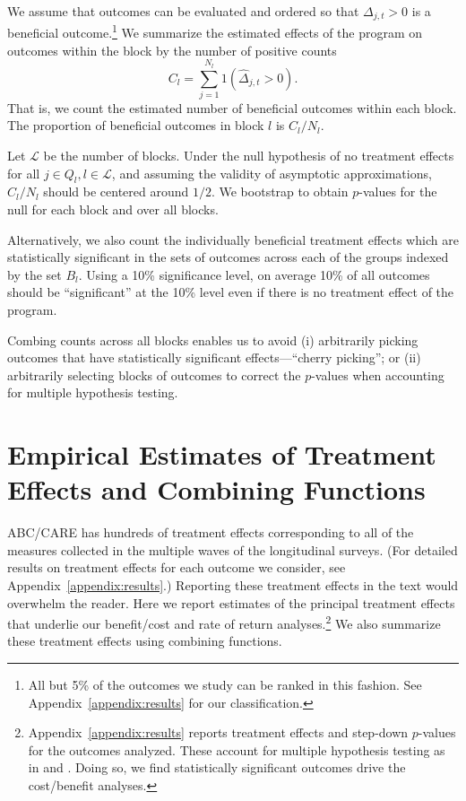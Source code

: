 We assume that outcomes can be evaluated and ordered so that $\Delta_{j,t} >0$ is a beneficial outcome.\footnote{All but 5\% of the outcomes we study can be ranked in this fashion. See Appendix~\ref{appendix:results} for our classification.} We summarize the estimated effects of the program on outcomes within the block by the number of positive counts
\begin{equation}
C_l = \sum^{N_l}_{j=1} 1 (\hat{\Delta}_{j,t} >0).
\end{equation}
That is, we count the estimated number of beneficial outcomes within each block. The proportion of beneficial outcomes in block $l$ is $C_l / N_l$.

Let $\mathcal{L}$ be the number of blocks. Under the null hypothesis of no treatment effects for all $j \in Q_l, l \in \mathcal{L}$, and assuming the validity of asymptotic approximations, $C_l / N_l$ should be centered around $1/2$. We bootstrap to obtain $p$-values for the null for each block and over all blocks.

Alternatively, we also count the individually beneficial treatment effects which are statistically significant in the sets of outcomes across each of the groups indexed by the set $B_l$. Using a 10\% significance level, on average 10\% of all outcomes should be ``significant'' at the 10\% level even if there is no treatment effect of the program.

Combing counts across all blocks enables us to avoid (i) arbitrarily picking outcomes that have statistically significant effects---``cherry picking''; or (ii) arbitrarily selecting blocks of outcomes to correct the $p$-values when accounting for multiple hypothesis testing.

\section{Empirical Estimates of Treatment Effects and Combining Functions}\label{section:c-functions}

ABC/CARE has hundreds of treatment effects corresponding to all of the measures collected in the multiple waves of the longitudinal surveys. (For detailed results on treatment effects for each outcome we consider, see Appendix~\ref{appendix:results}.) Reporting these treatment effects in the text would overwhelm the reader. Here we report estimates of the principal  treatment effects that underlie our benefit/cost and rate of return analyses.\footnote{Appendix~\ref{appendix:results} reports treatment effects and step-down  $p$-values for the outcomes analyzed. These account for multiple hypothesis testing as in \citet{Lehman_Romano_2005_AnnStat} and \citet{Romano_Shaikh_2006_AnnStat}. Doing so, we find statistically significant outcomes drive the cost/benefit analyses.} We also summarize these treatment effects using combining functions.


